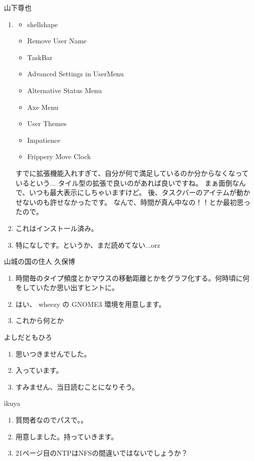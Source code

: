 \documentclass[mingoth,a4paper]{jsarticle}
\begin{document}
\begin{prework}{山下尊也}
  \begin{enumerate}
  \item
  \begin{itemize}
    \item shellshape
    \item Remove User Name
    \item TaskBar
    \item Advanced Settings in UserMenu
    \item Alternative Status Menu
    \item Axe Menu
    \item User Themes
    \item Impatience
    \item Frippery Move Clock
  \end{itemize}
  すでに拡張機能入れすぎて、自分が何で満足しているのか分からなくなっているという...
  タイル型の拡張で良いのがあれば良いですね。
  まぁ面倒なんで、いつも最大表示にしちゃいますけど。
  後、タスクバーのアイテムが動かせないのも許せなかったです。
  なんで、時間が真ん中なの！！とか最初思ったので。
  \item これはインストール済み。
  \item 特になしです。というか、まだ読めてない...orz 
  \end{enumerate}
\end{prework}

\begin{prework}{山城の国の住人 久保博 }
  \begin{enumerate}
  \item 時間毎のタイプ頻度とかマウスの移動距離とかをグラフ化する。何時頃に何をしていたか思い出すヒントに。
  \item はい、 wheezy の GNOME3 環境を用意します。
  \item これから何とか
  \end{enumerate}
\end{prework}

\begin{prework}{よしだともひろ}
  \begin{enumerate}
  \item 思いつきませんでした。
  \item 入っています。
  \item すみません、当日読むことになりそう。
  \end{enumerate}
\end{prework}

\begin{prework}{ikuya}
  \begin{enumerate}
  \item 質問者なのでパスで。。
  \item 用意しました。持っていきます。
  \item 21ページ目のNTPはNFSの間違いではないでしょうか？
  \end{enumerate}
\end{prework}
\end{document}
